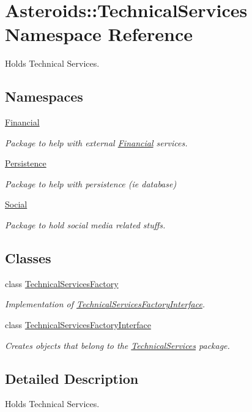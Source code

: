 \hypertarget{namespaceAsteroids_1_1TechnicalServices}{}\section{Asteroids\+:\+:Technical\+Services Namespace Reference}
\label{namespaceAsteroids_1_1TechnicalServices}


Holds Technical Services.  


\subsection*{Namespaces}
\begin{DoxyCompactItemize}
\item 
 \hyperlink{namespaceAsteroids_1_1TechnicalServices_1_1Financial}{Financial}
\begin{DoxyCompactList}\small\item\em Package to help with external \hyperlink{namespaceAsteroids_1_1TechnicalServices_1_1Financial}{Financial} services. \end{DoxyCompactList}\item 
 \hyperlink{namespaceAsteroids_1_1TechnicalServices_1_1Persistence}{Persistence}
\begin{DoxyCompactList}\small\item\em Package to help with persistence (ie database) \end{DoxyCompactList}\item 
 \hyperlink{namespaceAsteroids_1_1TechnicalServices_1_1Social}{Social}
\begin{DoxyCompactList}\small\item\em Package to hold social media related stuffs. \end{DoxyCompactList}\end{DoxyCompactItemize}
\subsection*{Classes}
\begin{DoxyCompactItemize}
\item 
class \hyperlink{classAsteroids_1_1TechnicalServices_1_1TechnicalServicesFactory}{Technical\+Services\+Factory}
\begin{DoxyCompactList}\small\item\em Implementation of \hyperlink{classAsteroids_1_1TechnicalServices_1_1TechnicalServicesFactoryInterface}{Technical\+Services\+Factory\+Interface}. \end{DoxyCompactList}\item 
class \hyperlink{classAsteroids_1_1TechnicalServices_1_1TechnicalServicesFactoryInterface}{Technical\+Services\+Factory\+Interface}
\begin{DoxyCompactList}\small\item\em Creates objects that belong to the \hyperlink{namespaceAsteroids_1_1TechnicalServices}{Technical\+Services} package. \end{DoxyCompactList}\end{DoxyCompactItemize}


\subsection{Detailed Description}
Holds Technical Services. 